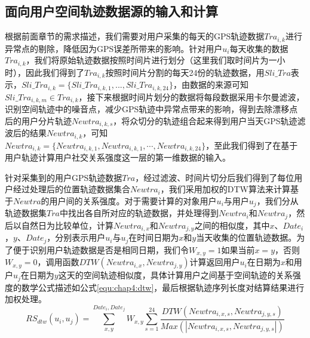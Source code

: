 \subsection{面向用户空间轨迹数据源的输入和计算}
根据前面章节的需求描述，我们需要对用户采集的每天的GPS轨迹数据$Tra_{i,k}$进行异常点的剔除，降低因为GPS误差所带来的影响。针对用户$u_{i}$每天收集的数据$Tra_{i,k}$，我们将原始轨迹数据按照时间片进行划分（这里我们取时间片为一小时），因此我们得到了$Tra_{i,k}$按照时间片分割的每天24份的轨迹数据，用$Sli\_Tra$表示，$Sli\_Tra_{i,k}=\{Sli\_Tra_{i,k,1},...,Sli\_Tra_{i,k,24}\}$，由数据的来源可知$Sli\_Tra_{i,k,m} \in Tra_{i,k}$，接下来根据时间片划分的数据将每段数据采用卡尔曼滤波，识别空间轨迹中的噪音点，减少GPS轨迹中异常点带来的影响，得到去除漂移点后的用户分片轨迹$Newtra_{i,k,s}$，将众切分的轨迹组合起来得到用户当天GPS轨迹滤波后的结果$Newtra_{i,k}$，可知$Newtra_{i,k}=\{ Newtra_{i,k,1},Newtra_{i,k,1}, \cdots,Newtra_{i,k,24}\}$，至此我们得到了在基于用户轨迹计算用户社交关系强度这一层的第一维数据的输入。
\par 针对采集到的用户GPS轨迹数据$Tra$，经过滤波、时间片切分后我们得到了每位用户经过处理后的位置轨迹数据集合$Newtra_{i}$，我们采用加权的DTW算法来计算基于$Newtra$的用户间的关系强度。对于需要计算的对象用户$u_{i}$与用户$u_{j}$，我们分从轨迹数据集$Tra$中找出各自所对应的轨迹数据，并处理得到$Newtra_{i}$和$Newtra_{j}$，然后以自然日为比较单位，计算$Newtra_{i,x}$和$Newtra_{j,y}$之间的相似度，其中$x 、 Date_{i}$，$y 、 Date_{j}$，分别表示用户$u_{i}$与$u_{j}$在时间日期为$x$和$y$当天收集的位置轨迹数据。为了便于识别用户轨迹数据是否是相同日期，我们令$W_{x,y}=1$如果当前$x=y$，否则$W_{x,y}=0$，调用函数$DTW(Newtra_{i,x},Newtra_{j,y})$计算返回用户$u_{i}$在日期为$x$和用户$u_{j}$在日期为$y$这天的空间轨迹相似度，具体计算用户之间基于空间轨迹的关系强度的数学公式描述如公式\ref{equ:chap4:dtw}，最后根据轨迹序列长度对结算结果进行加权处理。
\begin{equation}
\label{equ:chap4:dtw}
RS_{dtw}(u_{i},u_{j})=\sum_{x ,y }^{ Date_{i}, Date_{j}}W_{x,y}\sum_{s=1}^{24} \frac{DTW(Newtra_{i,x,s},Newtra_{j,y,s})}{Max(\left | Newtra_{i,x,s},Newtra_{j,y,s}  \right |)}
\end{equation}

